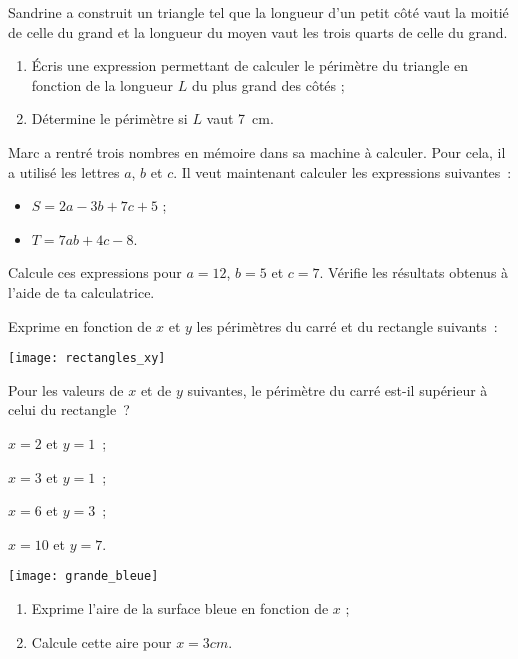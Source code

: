 \begin{exercice}
Sandrine a construit un triangle tel que la longueur d'un petit côté vaut la moitié de celle du grand et la longueur du moyen vaut les trois quarts de celle du grand.
\begin{enumerate}
 \item Écris une expression permettant de calculer le périmètre du triangle en fonction de la longueur $L$ du plus grand des côtés ;
 \item Détermine le périmètre si $L$ vaut 7 cm.
 \end{enumerate}
\end{exercice}


\newpage

\begin{exercice}
Marc a rentré trois nombres en mémoire dans sa machine à calculer. Pour cela, il a utilisé les lettres $a$, $b$ et $c$. Il veut maintenant calculer les expressions suivantes :
\begin{itemize}
 \item $S = 2a - 3b + 7c + 5$ ;
 \item $T = 7ab + 4c - 8$.
 \end{itemize}
Calcule ces expressions pour $a = 12$, $b = 5$ et $c = 7$. Vérifie les résultats obtenus à l'aide de ta calculatrice.
\end{exercice}


\begin{exercice}
Exprime en fonction de $x$ et $y$ les périmètres du carré et du rectangle suivants :
\begin{center} \texttt{[image: rectangles\_xy]} \end{center} 
Pour les valeurs de $x$ et de $y$ suivantes, le périmètre du carré est-il supérieur à celui du rectangle ?
\begin{colenumerate}{2}
 \item $x = 2$ et $y = 1$ ; 
 \item $x = 3$ et $y = 1$ ; 
 \item $x = 6$ et $y = 3$ ; 
 \item $x = 10$ et $y = 7$.
 \end{colenumerate}
\end{exercice}


\begin{exercice}
\begin{center} \texttt{[image: grande\_bleue]} \end{center}
\begin{enumerate}
 \item Exprime l'aire de la surface bleue en fonction de $x$ ;
 \item Calcule cette aire pour $x = 3 cm$.
 \end{enumerate}
\end{exercice}


